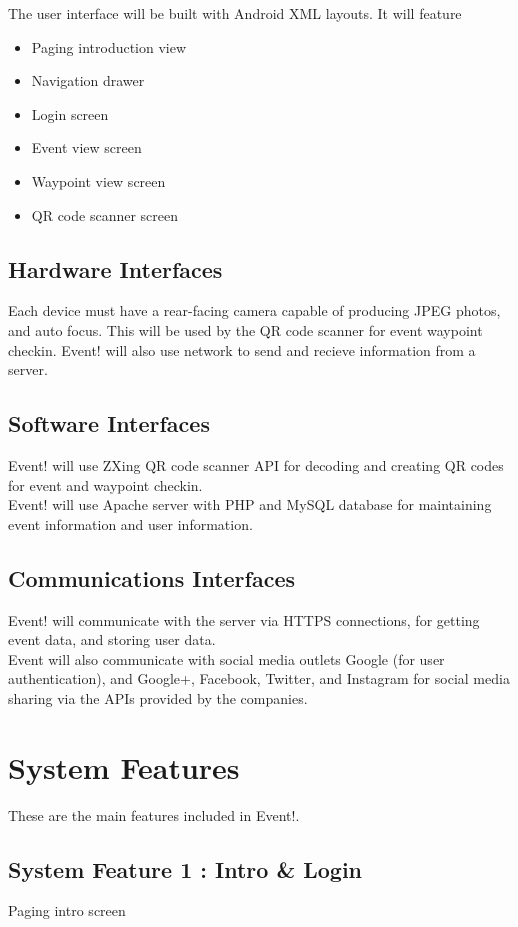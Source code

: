 \documentclass{scrreprt}
\begin{document}
The user interface will be built with Android XML layouts. It will feature
\begin{itemize}
\item Paging introduction view
\item Navigation drawer
\item Login screen
\item Event view screen
\item Waypoint view screen
\item QR code scanner screen
\end{itemize}

\section{Hardware Interfaces}
Each device must have a rear-facing camera capable of producing JPEG photos, 
and auto focus. This will be used by the QR code scanner for event waypoint checkin.
Event! will also use network to send and recieve information from a server.

\section{Software Interfaces}
Event! will use ZXing QR code scanner API for decoding and creating QR codes for 
event and waypoint checkin. \\
Event! will use Apache server with PHP and MySQL database for maintaining event 
information and user information.

\section{Communications Interfaces}
Event! will communicate with the server via HTTPS connections, for getting event 
data, and storing user data. \\
Event will also communicate with social media outlets Google (for user authentication), 
and Google+, Facebook, Twitter, and Instagram for social media sharing via the 
APIs provided by the companies.

\chapter{System Features}
These are the main features included in Event!.

\section{System Feature 1 : Intro \& Login}
Paging intro screen
\end{document}
